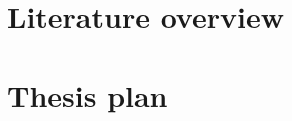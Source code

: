 \documentclass[12pt]{report}
\begin{document}

\section{Literature overview} %


\section{Thesis plan}
\end{document}
